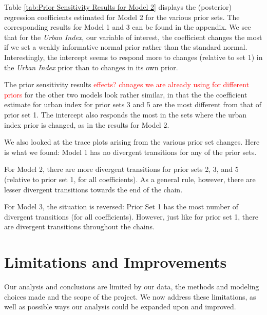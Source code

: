 \documentclass[12pt]{article}
\newcommand{\red}[1]{\textcolor{red}{#1}}
\newcommand{\blue}[1]{\textcolor{blue}{#1}}
\begin{document}
Table \ref{tab:Prior Sensitivity Results for Model 2} displays the (posterior) regression coefficients estimated for Model 2 for the various prior sets. The corresponding results for Model 1 and 3 can be found in the appendix. We see that for the \textit{Urban Index}, our variable of interest, the coefficient changes the most if we set a weakly informative normal prior rather than the standard normal. Interestingly, the intercept seems to respond more to changes (relative to set 1) in the \textit{Urban Index} prior than to changes in its own prior.

The prior sensitivity results \red{effects? chnages we are already using for different priors} for the other two models look rather similar, in that the the coefficient estimate for urban index for prior sets 3 and 5 are the most different from that of prior set 1. The intercept also responds the most in the sets where the urban index prior is changed, as in the results for Model 2.

We also looked at the trace plots arising from the various prior set changes. Here is what we found: Model 1 has no divergent transitions for any of the prior sets.

For Model 2, there are more divergent transitions for prior sets 2, 3, and 5  (relative to prior set 1, for all coefficients). As a general rule, however, there are lesser divergent transitions towards the end of the chain. 

For Model 3, the situation is reversed: Prior Set 1 has the most number of divergent transitions (for all coefficients). However, just like for prior set 1, there are divergent transitions throughout the chains.








\section{Limitations and Improvements}

Our analysis and conclusions are limited by our data, the methods and modeling choices made and the scope of the project.
We now address these limitations, as well as possible ways our analysis could be expanded upon and improved.
\end{document}
